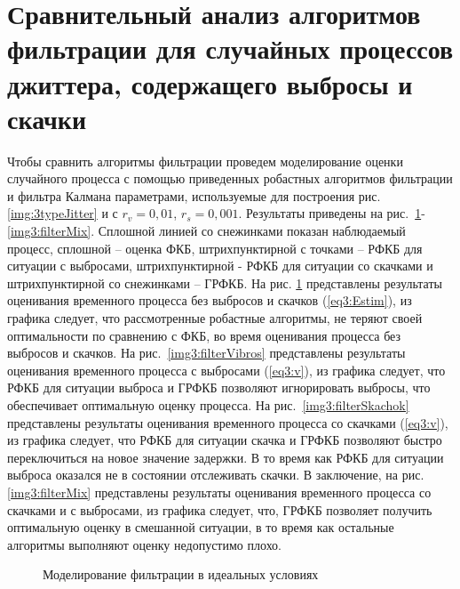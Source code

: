 \section{Сравнительный анализ алгоритмов фильтрации для случайных процессов джиттера, содержащего выбросы и скачки} \label{sect3_6}
Чтобы сравнить алгоритмы фильтрации проведем моделирование оценки случайного процесса с помощью приведенных робастных алгоритмов фильтрации и фильтра Калмана параметрами, 
используемые для построения рис. \ref{img:3typeJitter} и с $r_v=0,01$, $r_s=0,001$. 
Результаты приведены на рис. \ref{img3:filterIdeal}-\ref{img3:filterMix}. 
Сплошной линией со снежинками показан наблюдаемый процесс, 
сплошной – оценка ФКБ, штрихпунктирной с точками – РФКБ для ситуации с выбросами, штрихпунктирной - РФКБ для ситуации со скачками и штрихпунктирной со снежинками – ГРФКБ. 
На рис. \ref{img3:filterIdeal} представлены результаты оценивания временного процесса без выбросов и скачков (\ref{eq3:Estim}), 
из графика следует, что рассмотренные робастные алгоритмы, не теряют своей оптимальности по сравнению с ФКБ, во время оценивания процесса без выбросов и скачков.
На рис. \ref{img3:filterVibros} представлены результаты оценивания временного процесса с выбросами (\ref{eq3:v}), 
из графика следует, что РФКБ для ситуации выброса и ГРФКБ позволяют игнорировать выбросы, что обеспечивает оптимальную оценку процесса.
На рис. \ref{img3:filterSkachok} представлены результаты оценивания временного процесса со скачками (\ref{eq3:v}), 
из графика следует, что РФКБ для ситуации скачка и ГРФКБ позволяют быстро переключиться на новое значение задержки. 
В то время как РФКБ для ситуации выброса оказался не в состоянии отслеживать скачки.
В заключение, на рис. \ref{img3:filterMix} представлены результаты оценивания временного процесса со скачками и с выбросами, из графика следует, что, 
ГРФКБ позволяет получить оптимальную оценку в смешанной ситуации, в то время как остальные алгоритмы выполняют оценку недопустимо плохо.


\pgfplotsset{width=15cm, height=10cm, compat=1.3}
\begin{figure} [!h]
  \center
{}
\caption{Моделирование фильтрации в идеальных условиях}
  \label{img3:filterIdeal}
\end{figure}

